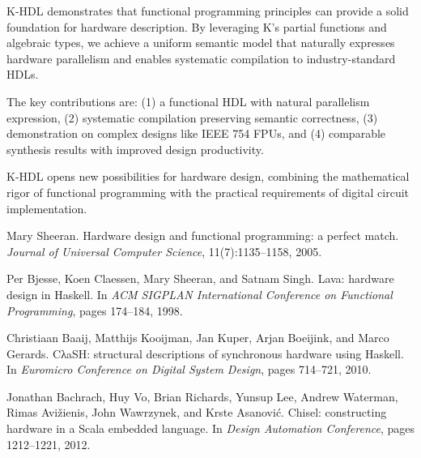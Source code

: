 \documentclass[10pt,twocolumn]{article}
\begin{document}
K-HDL demonstrates that functional programming principles can provide a solid foundation for hardware description. By leveraging K's partial functions and algebraic types, we achieve a uniform semantic model that naturally expresses hardware parallelism and enables systematic compilation to industry-standard HDLs.

The key contributions are: (1) a functional HDL with natural parallelism expression, (2) systematic compilation preserving semantic correctness, (3) demonstration on complex designs like IEEE 754 FPUs, and (4) comparable synthesis results with improved design productivity.

K-HDL opens new possibilities for hardware design, combining the mathematical rigor of functional programming with the practical requirements of digital circuit implementation.


\begin{thebibliography}{9}

Mary Sheeran.
\newblock Hardware design and functional programming: a perfect match.
\newblock \emph{Journal of Universal Computer Science}, 11(7):1135--1158, 2005.

Per Bjesse, Koen Claessen, Mary Sheeran, and Satnam Singh.
\newblock Lava: hardware design in Haskell.
\newblock In \emph{ACM SIGPLAN International Conference on Functional Programming}, pages 174--184, 1998.

Christiaan Baaij, Matthijs Kooijman, Jan Kuper, Arjan Boeijink, and Marco Gerards.
\newblock CλaSH: structural descriptions of synchronous hardware using Haskell.
\newblock In \emph{Euromicro Conference on Digital System Design}, pages 714--721, 2010.

Jonathan Bachrach, Huy Vo, Brian Richards, Yunsup Lee, Andrew Waterman, Rimas Avižienis, John Wawrzynek, and Krste Asanović.
\newblock Chisel: constructing hardware in a Scala embedded language.
\newblock In \emph{Design Automation Conference}, pages 1212--1221, 2012.

\end{thebibliography}
\end{document}
